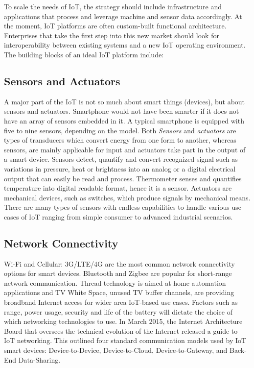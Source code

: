 \documentclass[sigconf]{acmart}
\begin{document}
	To scale the needs of IoT, the strategy should include infrastructure and applications that process and leverage machine and sensor data accordingly. At the moment, IoT platforms are often custom-built functional architecture. Enterprises that take the first step into this new market should look for interoperability between existing systems and a new IoT operating environment. The building blocks of an ideal IoT platform include:
	
	\subsection{Sensors and Actuators}
	A major part of the IoT is not so much about smart things (devices), but about sensors and actuators. Smartphone would not have been smarter if it does not have an array of sensors embedded in it. A typical smartphone is equipped with five to nine sensors, depending on the model. Both {\em Sensors} and  {\em actuators} are types of transducers which convert energy from one form to another, whereas sensors, are mainly applicable for input and actuators take part in the output of a smart device\cite{wiley-book}. Sensors detect, quantify and convert recognized signal such as variations in pressure, heat or brightness into an analog or a digital electrical output that can easily be read and process. Thermometer senses and quantifies temperature into digital readable format, hence it is a sensor. Actuators are mechanical devices, such as switches, which produce signals by mechanical means. There are many types of sensors with endless capabilities to handle various use cases of IoT ranging from 
	simple consumer to advanced industrial scenarios.	
	
	
	\subsection{Network Connectivity}
	Wi-Fi and Cellular: 3G/LTE/4G are the most common network connectivity options for smart devices. Bluetooth and Zigbee are popular for short-range network communication. Thread technology is aimed at home automation applications and TV White Space, unused TV buffer channels, are providing broadband Internet access for wider area IoT-based use cases. Factors such as range, power usage, security and life of the battery will dictate the choice of which networking technologies to use. In March 2015, the Internet Architecture Board that oversees the technical evolution of the Internet released a guide to IoT networking. This outlined four standard communication models used by IoT smart devices: Device-to-Device, Device-to-Cloud, Device-to-Gateway, and Back-End Data-Sharing\cite{internet-society}.
	
\end{document}
